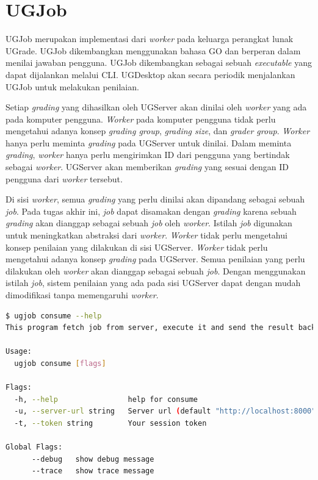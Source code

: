 \section{UGJob}


\par UGJob merupakan implementasi dari \textit{worker} pada keluarga perangkat lunak UGrade. UGJob dikembangkan menggunakan bahasa GO dan berperan dalam menilai jawaban pengguna. UGJob dikembangkan sebagai sebuah \textit{executable} yang dapat dijalankan melalui CLI. UGDesktop akan secara periodik menjalankan UGJob untuk melakukan penilaian.

\par Setiap \textit{grading} yang dihasilkan oleh UGServer akan dinilai oleh \textit{worker} yang ada pada komputer pengguna. \textit{Worker} pada komputer pengguna tidak perlu mengetahui adanya konsep \textit{grading group}, \textit{grading size}, dan \textit{grader group}. \textit{Worker} hanya perlu meminta \textit{grading} pada UGServer untuk dinilai. Dalam meminta \textit{grading}, \textit{worker} hanya perlu mengirimkan ID dari pengguna yang bertindak sebagai \textit{worker}. UGServer akan memberikan \textit{grading} yang sesuai dengan ID pengguna dari \textit{worker} tersebut.

\par Di sisi \textit{worker}, semua \textit{grading} yang perlu dinilai akan dipandang sebagai sebuah \textit{job}. Pada tugas akhir ini, \textit{job} dapat disamakan dengan \textit{grading} karena sebuah \textit{grading} akan dianggap sebagai sebuah \textit{job} oleh \textit{worker}. Istilah \textit{job} digunakan untuk meningkatkan abstraksi dari \textit{worker}. \textit{Worker} tidak perlu mengetahui konsep penilaian yang dilakukan di sisi UGServer. \textit{Worker} tidak perlu mengetahui adanya konsep \textit{grading} pada UGServer. Semua penilaian yang perlu dilakukan oleh \textit{worker} akan dianggap sebagai sebuah \textit{job}. Dengan menggunakan istilah \textit{job}, sistem penilaian yang ada pada sisi UGServer dapat dengan mudah dimodifikasi tanpa memengaruhi \textit{worker}.

\begin{lstlisting}[caption={Contoh Hasil Eksekusi Perintah \textit{ugjob consume}},label={lst:ugjob-consume},language=Bash,style=BashStyle]
$ ugjob consume --help
This program fetch job from server, execute it and send the result back to server.

Usage:
  ugjob consume [flags]

Flags:
  -h, --help                help for consume
  -u, --server-url string   Server url (default "http://localhost:8000")
  -t, --token string        Your session token

Global Flags:
      --debug   show debug message
      --trace   show trace message
\end{lstlisting}

